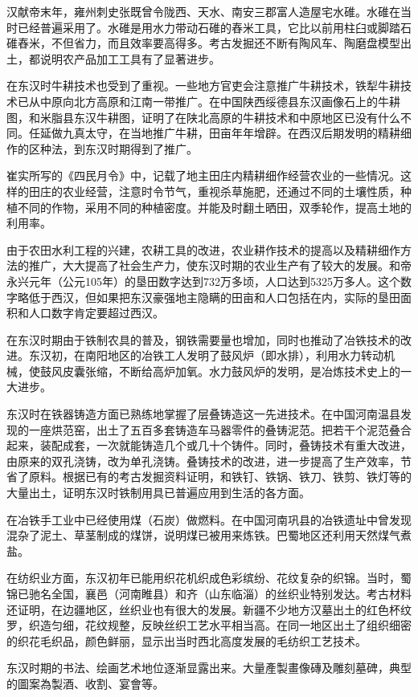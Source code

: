 汉献帝末年，雍州刺史张既曾令陇西、天水、南安三郡富人造屋宅水碓。水碓在当时已经普遍采用了。水碓是用水力带动石碓的舂米工具，它比以前用柱臼或脚踏石碓舂米，不但省力，而且效率要高得多。考古发掘还不断有陶风车、陶磨盘模型出土，都说明农产品加工工具有了显著进步。

在东汉时牛耕技术也受到了重视。一些地方官吏会注意推广牛耕技术，铁犁牛耕技术已从中原向北方高原和江南一带推广。在中国陕西绥德县东汉画像石上的牛耕图，和米脂县东汉牛耕图，证明了在陕北高原的牛耕技术和中原地区已没有什么不同。任延做九真太守，在当地推广牛耕，田亩年年增辟。在西汉后期发明的精耕细作的区种法，到东汉时期得到了推广。

崔实所写的《四民月令》中，记载了地主田庄内精耕细作经营农业的一些情况。这样的田庄的农业经营，注意时令节气，重视杀草施肥，还通过不同的土壤性质，种植不同的作物，采用不同的种植密度。并能及时翻土晒田，双季轮作，提高土地的利用率。

由于农田水利工程的兴建，农耕工具的改进，农业耕作技术的提高以及精耕细作方法的推广，大大提高了社会生产力，使东汉时期的农业生产有了较大的发展。和帝永兴元年（公元105年）的垦田数字达到732万多顷，人口达到5325万多人。这个数字略低于西汉，但如果把东汉豪强地主隐瞒的田亩和人口包括在内，实际的垦田面积和人口数字肯定要超过西汉。

在东汉时期由于铁制农具的普及，钢铁需要量也增加，同时也推动了冶铁技术的改进。东汉初，在南阳地区的冶铁工人发明了鼓风炉（即水排），利用水力转动机械，使鼓风皮囊张缩，不断给高炉加氧。水力鼓风炉的发明，是冶炼技术史上的一大进步。

东汉时在铁器铸造方面已熟练地掌握了层叠铸造这一先进技术。在中国河南温县发现的一座烘范窑，出土了五百多套铸造车马器零件的叠铸泥范。把若干个泥范叠合起来，装配成套，一次就能铸造几个或几十个铸件。同时，叠铸技术有重大改进，由原来的双孔浇铸，改为单孔浇铸。叠铸技术的改进，进一步提高了生产效率，节省了原料。根据已有的考古发掘资料证明，和铁钉、铁锅、铁刀、铁剪、铁灯等的大量出土，证明东汉时铁制用具已普遍应用到生活的各方面。

在冶铁手工业中已经使用煤（石炭）做燃料。在中国河南巩县的冶铁遗址中曾发现混杂了泥土、草茎制成的煤饼，说明煤已被用来炼铁。巴蜀地区还利用天然煤气煮盐。

在纺织业方面，东汉初年已能用织花机织成色彩缤纷、花纹复杂的织锦。当时，蜀锦已驰名全国，襄邑（河南睢县）和齐（山东临淄）的丝织业特别发达。考古材料还证明，在边疆地区，丝织业也有很大的发展。新疆不少地方汉墓出土的红色杯纹罗，织造匀细，花纹规整，反映丝织工艺水平相当高。在同一地区出土了组织细密的织花毛织品，颜色鲜丽，显示出当时西北高度发展的毛纺织工艺技术。

东汉时期的书法、绘画艺术地位逐渐显露出来。大量產製畫像磚及雕刻墓碑，典型的圖案為製酒、收割、宴會等。

